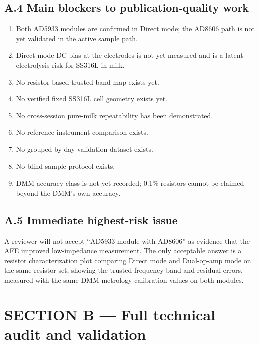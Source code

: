 \documentclass[11pt,a4paper]{article}
\begin{document}
\subsection{A.4 Main blockers to publication-quality work}

\begin{riskbox}
\begin{enumerate}
\item Both AD5933 modules are confirmed in Direct mode; the AD8606 path is not yet validated in the active sample path.
\item Direct-mode DC-bias at the electrodes is not yet measured and is a latent electrolysis risk for SS316L in milk.
\item No resistor-based trusted-band map exists yet.
\item No verified fixed SS316L cell geometry exists yet.
\item No cross-session pure-milk repeatability has been demonstrated.
\item No reference instrument comparison exists.
\item No grouped-by-day validation dataset exists.
\item No blind-sample protocol exists.
\item DMM accuracy class is not yet recorded; 0.1\% resistors cannot be claimed beyond the DMM's own accuracy.
\end{enumerate}
\end{riskbox}

\subsection{A.5 Immediate highest-risk issue}

\begin{reviewerbox}
A reviewer will not accept ``AD5933 module with AD8606'' as evidence that the AFE improved low-impedance measurement. The only acceptable answer is a resistor characterization plot comparing Direct mode and Dual-op-amp mode on the same resistor set, showing the trusted frequency band and residual errors, measured with the same DMM-metrology calibration values on both modules.
\end{reviewerbox}

\section{SECTION B --- Full technical audit and validation}
\label{sec:B}
\end{document}

